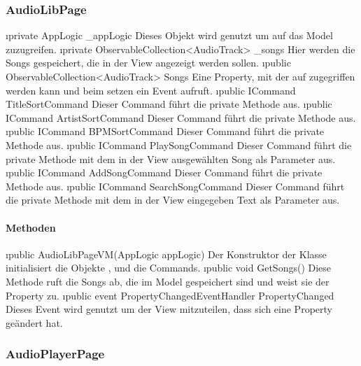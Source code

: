 \documentclass[../entwurf.tex]{subfiles}
\begin{document}
\subsubsection{AudioLibPage}
\begin{itemize}
	\i{private AppLogic \_appLogic} Dieses Objekt wird genutzt um auf das Model zuzugreifen.
	\i{private ObservableCollection<AudioTrack> \_songs} Hier werden die Songs gespeichert, die in der View angezeigt werden sollen.
	\i{public ObservableCollection<AudioTrack> Songs} Eine Property, mit der auf  zugegriffen werden kann und beim setzen ein Event aufruft.
	\i{public ICommand TitleSortCommand} Dieser Command führt die private Methode  aus.
	\i{public ICommand ArtistSortCommand} Dieser Command führt die private Methode  aus.
	\i{public ICommand BPMSortCommand} Dieser Command führt die private Methode  aus.
	\i{public ICommand PlaySongCommand} Dieser Command führt die private Methode  mit dem in der View ausgewählten Song als Parameter aus.
	\i{public ICommand AddSongCommand} Dieser Command führt die private Methode  aus.
	\i{public ICommand SearchSongCommand} Dieser Command führt die private Methode  mit dem in der View eingegeben Text als Parameter aus.
\end{itemize}
\paragraph{Methoden}
\begin{itemize}
	\i{public AudioLibPageVM(AppLogic appLogic)} Der Konstruktor der Klasse initialisiert die Objekte ,  und die Commands.
	\i{public void GetSongs()} Diese Methode ruft die Songs ab, die im Model gespeichert sind und weist sie der Property  zu.
	\i{public event PropertyChangedEventHandler PropertyChanged} Dieses Event wird genutzt um der View mitzuteilen, dass sich eine Property geändert hat.
\end{itemize}
\subsubsection{AudioPlayerPage}
\end{document}
